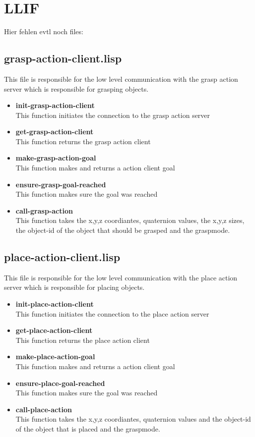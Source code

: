 \documentclass[main.tex]{subfiles}
\begin{document}
	  	\section{LLIF}
		Hier fehlen evtl noch files:
		\subsection{grasp-action-client.lisp}
		This file is responsible for the low level communication with the
		grasp action server which is responsible for grasping objects.
		\begin{itemize}
			\item \textbf{init-grasp-action-client} \\
			This function initiates the connection to the grasp action server
			\item \textbf{get-grasp-action-client} \\
			This function returns the grasp action client
			\item \textbf{make-grasp-action-goal} \\
			This function makes and returns a action client goal
			\item \textbf{ensure-grasp-goal-reached} \\
            This function makes sure the goal was reached
			\item \textbf{call-grasp-action} \\
			This function takes the x,y,z coordiantes, quaternion values, the x,y,z sizes, the object-id of the object that should be grasped and the graspmode.
		\end{itemize}
		\subsection{place-action-client.lisp}
		This file is responsible for the low level communication with the
		place action server which is responsible for placing objects.
	    \begin{itemize}
			\item \textbf{init-place-action-client} \\
			This function initiates the connection to the place action server
			\item \textbf{get-place-action-client} \\
			This function returns the place action client
			\item \textbf{make-place-action-goal} \\
			This function makes and returns a action client goal
			\item \textbf{ensure-place-goal-reached} \\
            This function makes sure the goal was reached
			\item \textbf{call-place-action} \\
			This function takes the x,y,z coordiantes, quaternion values  and the object-id of the object that is placed and the graspmode.
		\end{itemize}
\end{document}
